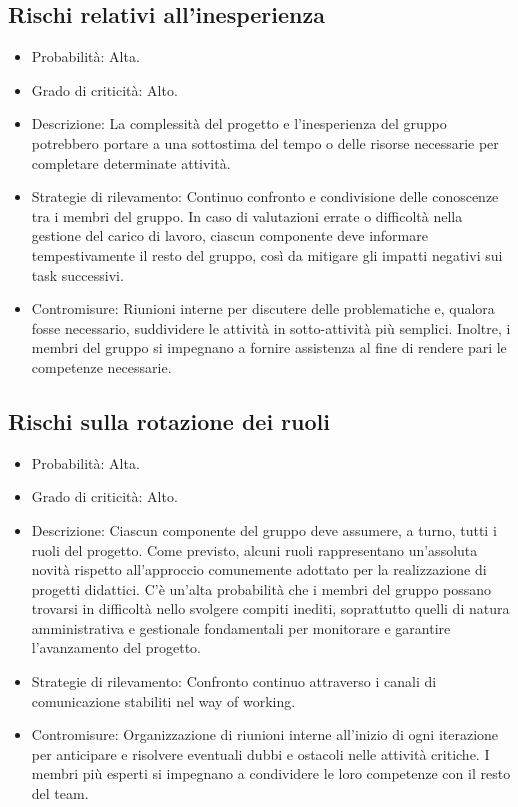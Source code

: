 \subsection{Rischi relativi all'inesperienza}
\begin{itemize}
  \item Probabilità: Alta.
  \item Grado di criticità: Alto.
  \item Descrizione: La complessità del progetto e l’inesperienza del gruppo potrebbero portare a una sottostima del tempo o delle risorse necessarie per completare determinate attività.
  \item Strategie di rilevamento: Continuo confronto e condivisione delle conoscenze tra i membri del gruppo. In caso di valutazioni errate o difficoltà nella gestione del carico di lavoro, ciascun componente deve informare tempestivamente il resto del gruppo, così da mitigare gli impatti negativi sui task successivi.
  \item Contromisure: Riunioni interne per discutere delle problematiche e, qualora fosse necessario, suddividere le attività in sotto-attività più semplici. Inoltre, i membri del gruppo si impegnano a fornire assistenza al fine di rendere pari le competenze necessarie.
\end{itemize}

\subsection{Rischi sulla rotazione dei ruoli}
\begin{itemize}
  \item Probabilità: Alta.
  \item Grado di criticità: Alto.
  \item Descrizione: Ciascun componente del gruppo deve assumere, a turno, tutti i ruoli del progetto. Come previsto, alcuni ruoli rappresentano un’assoluta novità rispetto all’approccio comunemente adottato per la realizzazione di progetti didattici. C'è un'alta probabilità che i membri del gruppo possano trovarsi in difficoltà nello svolgere compiti inediti, soprattutto quelli di natura amministrativa e gestionale fondamentali per monitorare e garantire l'avanzamento del progetto.
  \item Strategie di rilevamento: Confronto continuo attraverso i canali di comunicazione stabiliti nel way of working.
  \item Contromisure: Organizzazione di riunioni interne all’inizio di ogni iterazione per anticipare e risolvere eventuali dubbi e ostacoli nelle attività critiche. I membri più esperti si impegnano a condividere le loro competenze con il resto del team.
\end{itemize}

